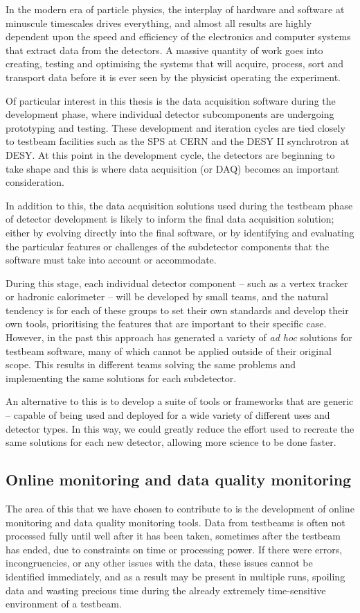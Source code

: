 In the modern era of particle physics, the interplay of hardware and software at minuscule timescales drives everything, and almost all results are highly dependent upon the speed and efficiency of the electronics and computer systems that extract data from the detectors. A massive quantity of work goes into creating, testing and optimising the systems that will acquire, process, sort and transport data before it is ever seen by the physicist operating the experiment.

Of particular interest in this thesis is the data acquisition software during the development phase, where individual detector subcomponents are undergoing prototyping and testing. These development and iteration cycles are tied closely to testbeam facilities such as the \acrfull{SPS} at \acrshort{CERN} and the DESY II synchrotron at \acrshort{DESY}. At this point in the development cycle, the detectors are beginning to take shape and this is where data acquisition (or \acrshort{DAQ}) becomes an important consideration. 

In addition to this, the data acquisition solutions used during the testbeam phase of detector development is likely to inform the final data acquisition solution; either by evolving directly into the final software, or by identifying and evaluating the particular features or challenges of the subdetector components that the software must take into account or accommodate.

During this stage, each individual detector component -- such as a vertex tracker or hadronic calorimeter -- will be developed by small teams, and the natural tendency is for each of these groups to set their own standards and develop their own tools, prioritising the features that are important to their specific case. However, in the past this approach has generated a variety of \textit{ad hoc} solutions for testbeam software, many of which cannot be applied outside of their original scope. This results in different teams solving the same problems and implementing the same solutions for each subdetector.

An alternative to this is to develop a suite of tools or frameworks that are generic -- capable of being used and deployed for a wide variety of different uses and detector types. In this way, we could greatly reduce the effort used to recreate the same solutions for each new detector, allowing more science to be done faster.

\subsection{Online monitoring and data quality monitoring}
The area of this that we have chosen to contribute to is the development of online monitoring and data quality monitoring tools. Data from testbeams is often not processed fully until well after it has been taken, sometimes after the testbeam has ended, due to constraints on time or processing power. If there were errors, incongruencies, or any other issues with the data, these issues cannot be identified immediately, and as a result may be present in multiple runs, spoiling data and wasting precious time during the already extremely time-sensitive environment of a testbeam.

